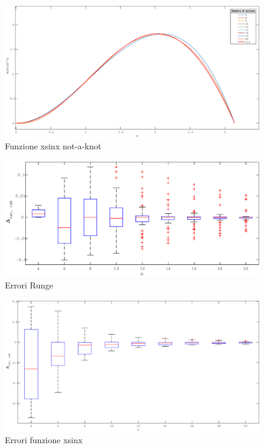 \begin{figure}[h]
\caption{Funzione xsinx not-a-knot}
\label{sin_nak}
\includegraphics[width=\textwidth]{plot/sin_nak}
\end{figure}
\begin{figure}[h]
\caption{Errori Runge}
\label{erunge_nak}
\includegraphics[width=\textwidth]{plot/errors}
\end{figure}
\begin{figure}[h]
\caption{Errori funzione xsinx}
\label{esin_nak}
\includegraphics[width=\textwidth]{plot/errors_sin}
\end{figure}
